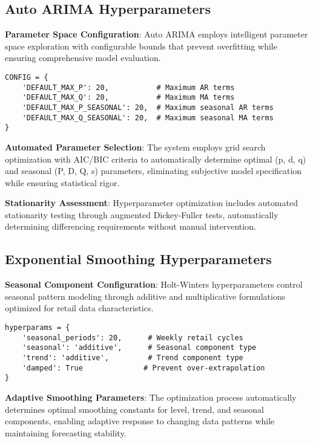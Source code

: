 \subsection{Auto ARIMA Hyperparameters}

\textbf{Parameter Space Configuration}: Auto ARIMA employs intelligent parameter space exploration with configurable bounds that prevent overfitting while ensuring comprehensive model evaluation.

\begin{lstlisting}[style=bashstyle, caption={ARIMA Hyperparameter Configuration}]
CONFIG = {
    'DEFAULT_MAX_P': 20,           # Maximum AR terms
    'DEFAULT_MAX_Q': 20,           # Maximum MA terms  
    'DEFAULT_MAX_P_SEASONAL': 20,  # Maximum seasonal AR terms
    'DEFAULT_MAX_Q_SEASONAL': 20,  # Maximum seasonal MA terms
}
\end{lstlisting}

\textbf{Automated Parameter Selection}: The system employs grid search optimization with AIC/BIC criteria to automatically determine optimal (p, d, q) and seasonal (P, D, Q, s) parameters, eliminating subjective model specification while ensuring statistical rigor.

\textbf{Stationarity Assessment}: Hyperparameter optimization includes automated stationarity testing through augmented Dickey-Fuller tests, automatically determining differencing requirements without manual intervention.

\subsection{Exponential Smoothing Hyperparameters}

\textbf{Seasonal Component Configuration}: Holt-Winters hyperparameters control seasonal pattern modeling through additive and multiplicative formulations optimized for retail data characteristics.

\begin{lstlisting}[style=bashstyle, caption={Exponential Smoothing Hyperparameter Setup}]
hyperparams = {
    'seasonal_periods': 20,      # Weekly retail cycles
    'seasonal': 'additive',      # Seasonal component type
    'trend': 'additive',         # Trend component type
    'damped': True              # Prevent over-extrapolation
}
\end{lstlisting}

\textbf{Adaptive Smoothing Parameters}: The optimization process automatically determines optimal smoothing constants for level, trend, and seasonal components, enabling adaptive response to changing data patterns while maintaining forecasting stability.


